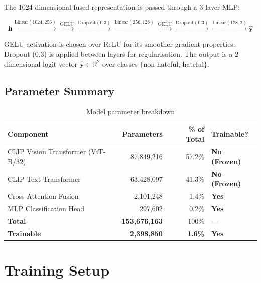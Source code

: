 \documentclass[12pt,a4paper]{article}
\begin{document}
The 1024-dimensional fused representation is passed through a 3-layer MLP:

\[
\mathbf{h} \xrightarrow{\text{Linear}(1024, 256)} \xrightarrow{\text{GELU}} \xrightarrow{\text{Dropout}(0.3)} \xrightarrow{\text{Linear}(256, 128)} \xrightarrow{\text{GELU}} \xrightarrow{\text{Dropout}(0.3)} \xrightarrow{\text{Linear}(128, 2)} \hat{\mathbf{y}}
\]

GELU activation is chosen over ReLU for its smoother gradient properties. Dropout (0.3) is applied between layers for regularisation. The output is a 2-dimensional logit vector $\hat{\mathbf{y}} \in \mathbb{R}^2$ over classes $\{$non-hateful, hateful$\}$.

\subsection{Parameter Summary}

\begin{table}[H]
  \centering
  \caption{Model parameter breakdown}
  \renewcommand{\arraystretch}{1.3}
  \begin{tabular}{lrrl}
    \toprule
    \rowcolor{primaryblue!15}
    \textbf{Component} & \textbf{Parameters} & \textbf{\% of Total} & \textbf{Trainable?} \\
    \midrule
    CLIP Vision Transformer (ViT-B/32) & 87,849,216 & 57.2\% & \textcolor{accentorange}{\textbf{No (Frozen)}} \\
    CLIP Text Transformer              & 63,428,097 & 41.3\% & \textcolor{accentorange}{\textbf{No (Frozen)}} \\
    Cross-Attention Fusion             & 2,101,248  & 1.4\%  & \textcolor{successgreen}{\textbf{Yes}} \\
    MLP Classification Head            & 297,602    & 0.2\%  & \textcolor{successgreen}{\textbf{Yes}} \\
    \midrule
    \textbf{Total}     & \textbf{153,676,163} & 100\%  & --- \\
    \textbf{Trainable} & \textbf{2,398,850}   & \textbf{1.6\%} & \textcolor{successgreen}{\textbf{Yes}} \\
    \bottomrule
  \end{tabular}
  \label{tab:params}
\end{table}

\section{Training Setup}
\end{document}

